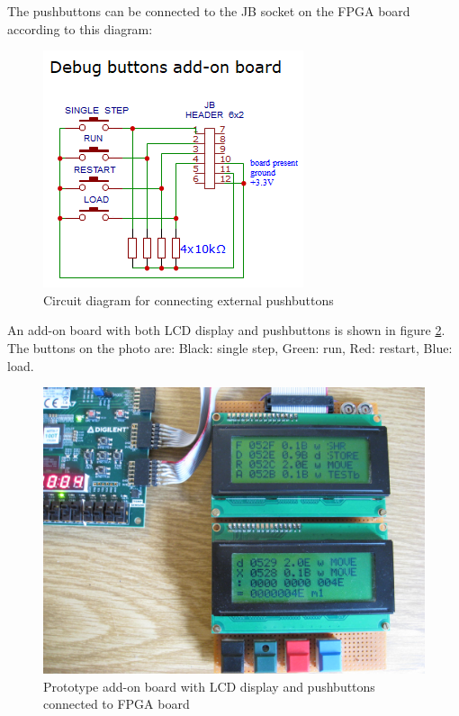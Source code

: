 \documentclass[11pt,a4paper,oneside,openright]{report}
\newcommand{\vv}{ \vspace{2mm} }   %
\begin{document}
The pushbuttons can be connected to the JB socket on the FPGA board according to this diagram:

\begin{center}
\begin{figure}[ht]
\includegraphics{SchematicDebugButtons.png}
\caption{Circuit diagram for connecting external pushbuttons}
\label{fig:PushbuttonsDiagram}
\end{figure}
\end{center}
\vv

An add-on board with both LCD display and pushbuttons is shown in figure  \ref{fig:addOnBoard}. The buttons on the photo are: Black: single step, Green: run, Red: restart, Blue: load.
\vv

\begin{center}
\begin{figure}[ht]
\includegraphics[width=\textwidth]{LCDboard.jpg}
\caption{Prototype add-on board with LCD display and pushbuttons connected to FPGA board}
\label{fig:addOnBoard}
\end{figure}
\end{center}
\clearpage
\end{document}
